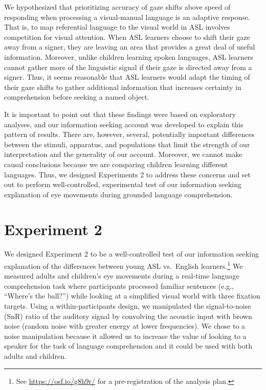 \documentclass[english,floatsintext,man]{apa6}
\begin{document}
We hypothesized that prioritizing accuracy of gaze shifts above speed of
responding when processing a visual-manual language is an adaptive
response. That is, to map referential language to the visual world in
ASL involves competition for visual attention. When ASL learners choose
to shift their gaze away from a signer, they are leaving an area that
provides a great deal of useful information. Moreover, unlike children
learning spoken languages, ASL learners cannot gather more of the
linguistic signal if their gaze is directed away from a signer. Thus, it
seems reasonable that ASL learners would adapt the timing of their gaze
shifts to gather additional information that increases certainty in
comprehension before seeking a named object.

It is important to point out that these findings were based on
exploratory analyses, and our information seeking account was developed
to explain this pattern of results. There are, however, several,
potentially important differences between the stimuli, apparatus, and
populations that limit the strength of our interpretation and the
generality of our account. Moreover, we cannot make causal conclusions
because we are comparing children learning different languages. Thus, we
designed Experiments 2 to address these concerns and set out to perform
well-controlled, experimental test of our information seeking
explanation of eye movements during grounded language comprehension.

\hypertarget{experiment-2}{%
\section{Experiment 2}\label{experiment-2}}

We designed Experiment 2 to be a well-controlled test of our information
seeking explanation of the differences between young ASL vs.~English
learners.\footnote{See \url{https://osf.io/g8h9r/} for a
  pre-registration of the analysis plan.} We measured adults and
children's eye movements during a real-time language comprehension task
where participants processed familiar sentences (e.g., \enquote{Where's
the ball?}) while looking at a simplified visual world with three
fixation targets. Using a within-participants design, we manipulated the
signal-to-noise (SnR) ratio of the auditory signal by convolving the
acoustic input with brown noise (random noise with greater energy at
lower frequencies). We chose to a noise manipulation because it allowed
us to increase the value of looking to a speaker for the task of
language comprehension and it could be used with both adults and
children.
\end{document}
